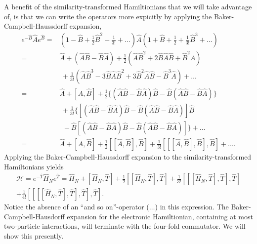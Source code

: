 A benefit of the similarity-transformed Hamiltionians that we will take advantage of,
is that we can write the operators
more expicitly by applying the Baker-Campbell-Haussdorff
expansion\cite{campbell1897law,baker1905alternants,hausdorff1906symbolische},
\begin{equation}
    \begin{aligned}
        e^{-\hat{B}}\hat{A}e^{\hat{B}}
        =& (1 - \hat{B} + \frac{1}{2}\hat{B}^2 - \frac{1}{3!} + \dots)
        \hat{A} (1 + \hat{B} + \frac{1}{2} + \frac{1}{3!}\hat{B}^3 + \dots) \\
        =& \hat{A} + (\hat{A}\hat{B} - \hat{B}\hat{A}) 
        + \frac{1}{2}(\hat{A}\hat{B}^2 + 2\hat{B}\hat{A}\hat{B} + \hat{B}^2\hat{A})
        \\ &\ + \frac{1}{3!}(
            \hat{A}\hat{B}^3 - 3\hat{B}\hat{A}\hat{B}^2 + 3\hat{B}^2\hat{A}\hat{B}
            - \hat{B}^3\hat{A}
        ) + \dots \\
        =& \hat{A} + [\hat{A}, \hat{B}] + 
        \frac{1}{2}\{
            (\hat{A}\hat{B} - \hat{B}\hat{A})\hat{B}
            -\hat{B}(\hat{A}\hat{B} - \hat{B}\hat{A})     
        \} \\ &\ + \frac{1}{3!} \{
            [(\hat{A}\hat{B} - \hat{B}\hat{A})\hat{B}
            -\hat{B}(\hat{A}\hat{B} - \hat{B}\hat{A})] \hat{B}\\
            &\ \ -\hat{B}[(\hat{A}\hat{B} - \hat{B}\hat{A})\hat{B}
            -\hat{B}(\hat{A}\hat{B} - \hat{B}\hat{A})]
        \} + \dots \\
        =& \hat{A} + [\hat{A}, \hat{B}]
        + \frac{1}{2}[[\hat{A}, \hat{B}], \hat{B}]
        + \frac{1}{3!} [[[\hat{A}, \hat{B}], \hat{B}], \hat{B}] + \dots .
    \end{aligned}
\end{equation}
Applying the Baker-Campbell-Haussdorff expansion to the similarity-transformed 
Hamiltonians yields
\begin{equation}
    \begin{gathered}
    \label{eq:bch_hamiltonian}
    \mathscr{H} = 
    e^{-\hat{T}}\hat{H}_Ne^{\hat{T}} = \hat{H}_N + [\hat{H}_N, \hat{T}]
        + \frac{1}{2}[[\hat{H}_N, \hat{T}], \hat{T}]
        + \frac{1}{3!}[[[\hat{H}_N, \hat{T}], \hat{T}], \hat{T}] \\
        + \frac{1}{4!}[[[[\hat{H}_N, \hat{T}], \hat{T}], \hat{T}], \hat{T}].
    \end{gathered}
\end{equation}
Notice the absence of an ``and so on''-operator ($\dots$) in this expression. The Baker-Campbell-Hausdorff expansion 
for the electronic Hamiltionian, containing at most two-particle interactions, will 
terminate with the four-fold commutator. We will show this presently.

